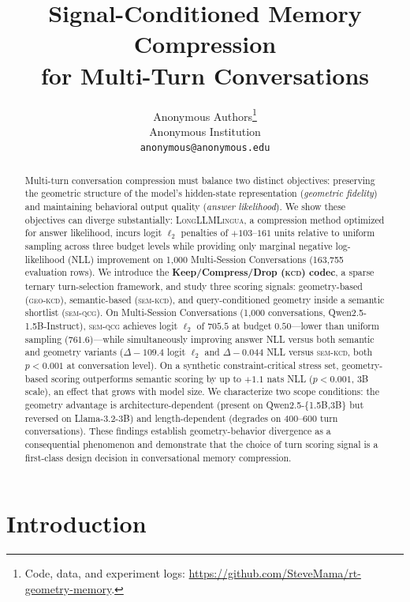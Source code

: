 \documentclass[11pt]{article}
\title{\textbf{Signal-Conditioned Memory Compression\\for Multi-Turn Conversations}}
\author{
  Anonymous Authors\thanks{Code, data, and experiment logs: \url{https://github.com/SteveMama/rt-geometry-memory}.} \\
  Anonymous Institution \\
  \texttt{anonymous@anonymous.edu}
}
\date{}
\newcommand{\kcd}{\textsc{kcd}}
\newcommand{\semqcg}{\textsc{sem-qcg}}
\newcommand{\geokcd}{\textsc{geo-kcd}}
\newcommand{\semkcd}{\textsc{sem-kcd}}
\begin{document}
\maketitle

\begin{abstract}
Multi-turn conversation compression must balance two distinct objectives:
preserving the geometric structure of the model's hidden-state representation
(\emph{geometric fidelity}) and maintaining behavioral output quality
(\emph{answer likelihood}).
We show these objectives can diverge substantially:
\textsc{LongLLMLingua}, a compression method optimized for answer likelihood,
incurs logit $\ell_2$ penalties of $+103$--$161$ units relative to uniform
sampling across three budget levels while providing only marginal negative
log-likelihood (NLL) improvement on 1{,}000 Multi-Session Conversations
(163{,}755 evaluation rows).
We introduce the \textbf{Keep/Compress/Drop (\kcd{}) codec},
a sparse ternary turn-selection framework,
and study three scoring signals:
geometry-based (\geokcd{}),
semantic-based (\semkcd{}),
and query-conditioned geometry inside a semantic shortlist (\semqcg{}).
On Multi-Session Conversations (1{,}000 conversations, Qwen2.5-1.5B-Instruct),
\semqcg{} achieves logit $\ell_2$ of $705.5$ at budget $0.50$---lower
than uniform sampling ($761.6$)---while simultaneously improving answer NLL
versus both semantic and geometry variants
($\Delta{-}109.4$ logit $\ell_2$ and $\Delta{-}0.044$ NLL versus \semkcd{},
both $p{<}0.001$ at conversation level).
On a synthetic constraint-critical stress set, geometry-based scoring
outperforms semantic scoring by up to $+1.1$ nats NLL ($p{<}0.001$, 3B scale),
an effect that grows with model size.
We characterize two scope conditions:
the geometry advantage is architecture-dependent
(present on Qwen2.5-\{1.5B,3B\} but reversed on Llama-3.2-3B)
and length-dependent
(degrades on 400--600 turn conversations).
These findings establish geometry-behavior divergence as a consequential
phenomenon and demonstrate that the choice of turn scoring signal is a
first-class design decision in conversational memory compression.
\end{abstract}

\section{Introduction}
\end{document}
